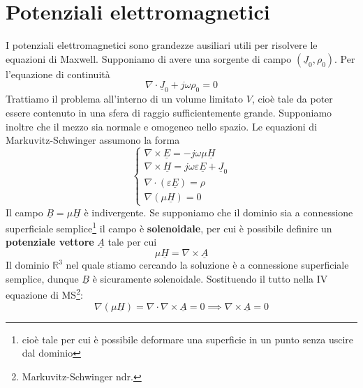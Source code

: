 \documentclass{book}
\begin{document}
        \section{Potenziali elettromagnetici}
            I potenziali elettromagnetici sono grandezze ausiliari utili per risolvere le equazioni di Maxwell. Supponiamo di avere una sorgente di campo $(\underline{J}_{0}, \rho_{0})$. Per l'equazione di
            continuità
            \begin{equation}
                \nabla \cdot \underline{J}_{0}+ j \omega \rho_{0} = 0
            \end{equation}
            Trattiamo il problema all'interno di un volume limitato $V$, cioè tale da poter essere contenuto in una sfera di raggio sufficientemente grande. Supponiamo inoltre che il mezzo sia normale e omogeneo
            nello spazio. Le equazioni di Markuvitz-Schwinger assumono la forma
            \begin{equation}
                \begin{cases}
                    \displaystyle \nabla \times \underline{E} = -j \omega \mu \underline{H} \\
                    \displaystyle \nabla \times \underline{H} = j \omega \varepsilon \underline{E}+\underline{J}_{0} \\
                    \nabla \cdot (\varepsilon \underline{E}) = \rho \\
                    \nabla (\mu \underline{H}) = 0
                \end{cases}
            \end{equation}
            Il campo $\underline{B}= \mu \underline{H}$ è indivergente. Se supponiamo che il dominio sia a connessione superficiale semplice\footnote{cioè tale per cui è possibile deformare una superficie in un punto senza uscire dal dominio}
            il campo è \textbf{solenoidale}, per cui è possibile definire un \textbf{potenziale vettore} $\underline{A}$ tale per cui
            \begin{equation}
                \mu \underline{H} = \nabla \times \underline{A}
            \end{equation}
            Il dominio $\mathbb{R} ^{3}$ nel quale stiamo cercando la soluzione è a connessione superficiale semplice, dunque $\underline{B}$ è sicuramente solenoidale.
            Sostituendo il tutto nella IV equazione di MS\footnote{Markuvitz-Schwinger ndr.}:
            \begin{equation}
                \nabla (\mu \underline{H}) = \nabla \cdot \nabla \times \underline{A} = 0 \implies \nabla \times \underline{A} = 0
            \end{equation}
\end{document}

